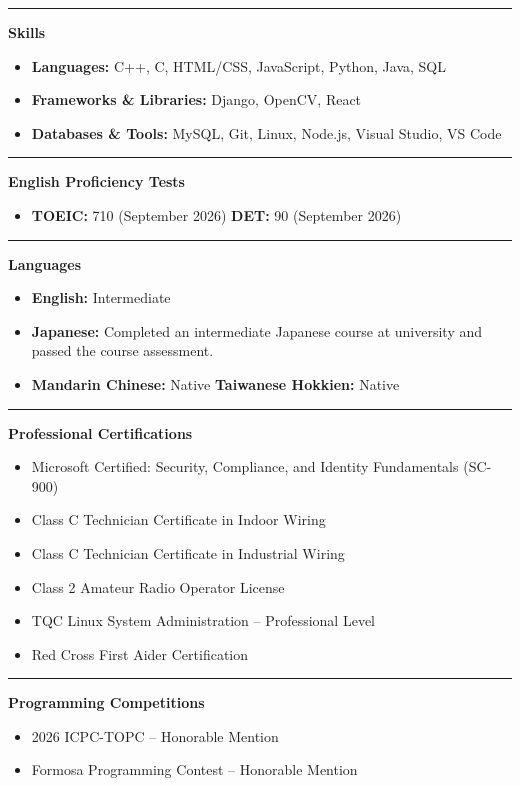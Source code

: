 \documentclass[10pt,letterpaper]{article}
\newcommand{\resumesection}[1]{%
    \par\vspace{2pt}\hrule\vspace{2pt}%
    {\noindent\large\bfseries #1\par}\vspace{1pt}%
}
\begin{document}
\resumesection{Skills}

\begin{itemize}[leftmargin=1em,noitemsep]
	\item \textbf{Languages:}
	      C++, C, HTML/CSS, JavaScript, Python, Java, SQL
	\item \textbf{Frameworks \& Libraries:}
	      Django, OpenCV, React
	\item \textbf{Databases \& Tools:}
	      MySQL, Git, Linux, Node.js, Visual Studio, VS Code
\end{itemize}

\resumesection{English Proficiency Tests}

\begin{itemize}[leftmargin=1em,noitemsep]
    \item \textbf{TOEIC:} 710 (September 2026) \hspace{2em} \textbf{DET:} 90 (September 2026)
\end{itemize}

\resumesection{Languages}

\begin{itemize}[leftmargin=1em,noitemsep]
    \item \textbf{English:} Intermediate
    \item \textbf{Japanese:} Completed an intermediate Japanese course at university and passed the course assessment.
    \item \textbf{Mandarin Chinese:} Native \hspace{1.5em} \textbf{Taiwanese Hokkien:} Native
\end{itemize}


\resumesection{Professional Certifications}
\begin{itemize}[leftmargin=1em,noitemsep]
    \item Microsoft Certified: Security, Compliance, and Identity Fundamentals (SC-900)
    \item Class C Technician Certificate in Indoor Wiring
    \item Class C Technician Certificate in Industrial Wiring
    \item Class 2 Amateur Radio Operator License
    \item TQC Linux System Administration -- Professional Level
    \item Red Cross First Aider Certification
\end{itemize}

\resumesection{Programming Competitions}
\begin{itemize}[leftmargin=1em,noitemsep]
    \item 2026 ICPC-TOPC -- Honorable Mention
    \item Formosa Programming Contest -- Honorable Mention
\end{itemize}
\end{document}
